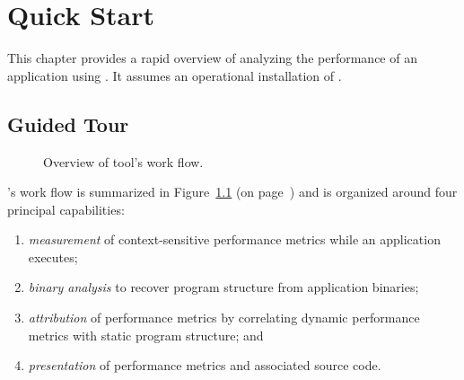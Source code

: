 \documentclass[11pt,letterpaper]{report}
\begin{document}

\chapter{Quick Start}
\label{chpt:quickstart}

This chapter provides a rapid overview of analyzing the performance of an application using \HPCToolkit{}.
It assumes an operational installation of \HPCToolkit{}.



\section{Guided Tour}
\label{chpt:quickstart:tour}

\begin{figure}[t]
\caption{Overview of \HPCToolkit{} tool's work flow.}
\label{fig:hpctoolkit-overview:b}
\end{figure}

\HPCToolkit{}'s work flow is summarized in Figure~\ref{fig:hpctoolkit-overview:b} (on page~\pageref{fig:hpctoolkit-overview:b}) and is organized around four principal capabilities:
\begin{enumerate}
  \item \emph{measurement} of context-sensitive performance metrics while an application executes;
  \item \emph{binary analysis} to recover program structure from application binaries;
  \item \emph{attribution} of performance metrics by correlating dynamic performance metrics with static program structure; and
  \item \emph{presentation} of performance metrics and associated source code.
\end{enumerate}
\end{document}
